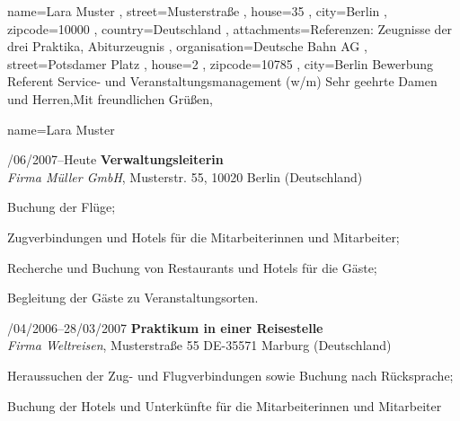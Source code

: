 \documentclass[a4paper, 12pt]{classycv}
\begin{document}
\begin{CoverLetter}[%
	submitter information line color=none%
	, recipient information line color=none%
	, has body separator=no%
	, has footer separator=no%
]{%
	name=Lara Muster%
	, street=Musterstraße%
	, house=35%
	, city=Berlin%
	, zipcode=10000%
	, country=Deutschland%
	, attachments={Referenzen: Zeugnisse der drei Praktika, Abiturzeugnis}
}{%
	, organisation=Deutsche Bahn AG%
	, street=Potsdamer Platz%
	, house=2%
	, zipcode=10785%
	, city=Berlin%
}{Bewerbung Referent Service- und Veranstaltungsmanagement (w/m) }{Sehr geehrte Damen und Herren,}{Mit freundlichen Grüßen,}%
\blindtext[1]%
\end{CoverLetter}

\begin{Resume}{%
	name=Lara Muster%
}%
%
%
\begin{Entry}{%
    \color{accent-color}/06/2007–Heute%
}{%
    \textbf{Verwaltungsleiterin}\\\textit{Firma Müller GmbH}, Musterstr. 55, 10020 Berlin (Deutschland)%
}%
    \begin{List}[skip above=0pt]%
		\item Buchung der Flüge;
		\item Zugverbindungen und Hotels für die Mitarbeiterinnen und Mitarbeiter;
		\item Recherche und Buchung von Restaurants und Hotels für die Gäste;
        \item Begleitung der Gäste zu Veranstaltungsorten.
	\end{List}
\end{Entry}
%
\begin{Entry}{%
    \color{accent-color}/04/2006–28/03/2007%
}{%
    \textbf{Praktikum in einer Reisestelle}\\\textit{Firma Weltreisen}, Musterstraße 55 DE-35571 Marburg (Deutschland)%
}%
    \begin{List}[skip above=0pt]%
        \item Heraussuchen der Zug- und Flugverbindungen sowie Buchung nach Rücksprache;
        \item Buchung der Hotels und Unterkünfte für die Mitarbeiterinnen und Mitarbeiter
    \end{List}
\end{Entry}

\end{Resume}
\end{document}
